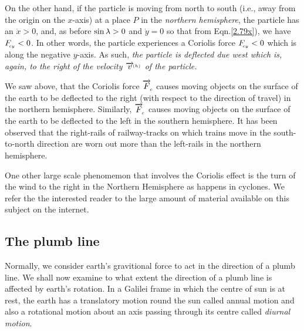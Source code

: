 On the other hand, if the particle is moving from north to 
south (i.e., away from the origin on the $x$-axis) at a 
place $P$ in the \textsl{northern hemisphere}, the particle 
has an $\dot{x}>0$, and, as before $\sin{\lambda}>0$ and 
$\dot{y}=0$ so that from Eqn.\eqref{2.79x}), we have 
$F_{_{\hspace*{-1.5pt}{cy}}}<0$. In other words, the particle experiences a 
Coriolis force $F_{_{\hspace*{-1.5pt}{cy}}}<0$ which is along the negative 
$y$-axis. As such, \textsl{the particle is deflected due 
west which is, again, to the right of the velocity 
$\overrightarrow{v}^{_{\hspace*{-1.5pt}{(h)}}}$ of the particle.}

We saw above, that the Coriolis force $\overrightarrow{F}_{_{\hspace*{-1.5pt}{c}}}$ 
causes moving objects on the surface of the earth to be 
deflected to the right (with respect to the direction of 
travel) in the northern hemisphere. Similarly, 
$\overrightarrow{F}_{_{\hspace*{-1.5pt}{c}}}$ causes moving objects on the surface of 
the earth to be deflected to the left in the southern 
hemisphere. It has been observed that the right-rails of 
railway-tracks on which trains move in the south-to-north 
direction are worn out more than the left-rails in the 
northern hemisphere.

One other large scale phenomemon that involves the Coriolis 
effect is the turn of the wind to the right in the Northern 
Hemisphere as happens in cyclones. We refer the the 
interested reader to the large amount of material available 
on this subject on the internet.

\vspace{-.4cm}
\subsection{The plumb line}
Normally, we consider earth's gravitional force to act in 
the direction of a plumb line. We shall now examine to what 
extent the direction of a plumb line is affected by earth's 
rotation. In a Galilei frame in which the centre of sun is 
at rest, the earth has a translatory motion round the sun 
called {annual motion} and also a rotational motion about 
an 
axis passing through its centre called \textsl{diurnal 
motion}.

